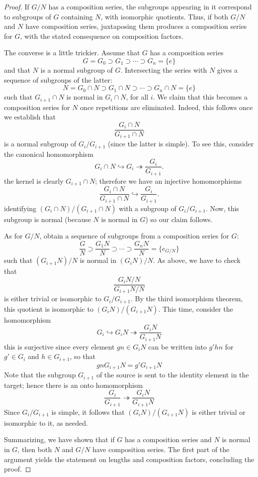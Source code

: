\begin{proof}
If $G/N$ has a composition series, the subgroups appearing in it correspond to subgroups of $G$ containing $N$, with isomorphic quotients. Thus, if both $G/N$ and $N$ have composition series, juxtaposing them produces a composition series for $G$, with the stated consequence on composition factors.\par
The converse is a little trickier. Assume that $G$ has a composition series
\[G=G_0\supset G_1\supset\cdots\supset G_n=\{e\}\]
and that $N$ is a normal subgroup of $G$. Intersecting the series with $N$ gives a sequence of subgroups of the latter:
\[N=G_0\cap N\supset G_1\cap N\supset\cdots\supset G_n\cap N=\{e\}\]
such that $G_{i+1}\cap N$ is normal in $G_i\cap N$, for all $i$. We claim that this becomes a composition series for $N$ once repetitions are eliminated. Indeed, this follows once we establish that
\[\frac{G_{i}\cap N}{G_{i+1}\cap N}\]
is a normal subgroup of $G_{i}/G_{i+1}$ (since the latter is simple). To see this, consider the canonical homomorphism
\[G_i\cap N\hookrightarrow G_i\twoheadrightarrow\frac{G_i}{G_{i+1}}.\]
the kernel is clearly $G_{i+1}\cap N$; therefore we have an injective homomorphisms
\[\frac{G_{i}\cap N}{G_{i+1}\cap N}\hookrightarrow\frac{G_{i}}{G_{i+1}}.\]
identifying $(G_i\cap N)/(G_{i+1}\cap N)$ with a subgroup of $G_i/G_{i+1}$. Now, this subgroup is normal (because $N$ is normal in $G$) so our claim follows.\par
As for $G/N$, obtain a sequence of subgroups from a composition series for $G$:
\[\frac{G}{N}\supset\frac{G_1N}{N}\supset\cdots\supset\frac{G_nN}{N}=\{e_{G/N}\}\]
such that $(G_{i+1}N)/N$ is normal in $(G_iN)/N$. As above, we have to check that 
\[\frac{G_iN/N}{G_{i+1}N/N}\]
is either trivial or isomorphic to $G_i/G_{i+1}$. By the third isomorphism theorem, this quotient is isomorphic to $(G_iN)/(G_{i+1}N)$. This time, consider the homomorphism
\[G_i\hookrightarrow G_iN\twoheadrightarrow\frac{G_iN}{G_{i+1}N}\]
this is surjective since every element $gn\in G_iN$ can be written into $g'hn$ for $g'\in G_i$ and $h\in G_{i+1}$, so that
\[gnG_{i+1}N=g'G_{i+1}N\]
Note that the subgroup $G_{i+1}$ of the source is sent to the identity element in the target; hence there is an onto homomorphism
\[\frac{G_i}{G_{i+1}}\twoheadrightarrow\frac{G_iN}{G_{i+1}N}\]
Since $G_i/G_{i+1}$ is simple, it follows that $(G_iN)/(G_{i+1}N)$ is either trivial or isomorphic to it, as needed.\par 
Summarizing, we have shown that if $G$ has a composition series and $N$ is normal in $G$, then both $N$ and $G/N$ have composition series. The first part of the argument yields the statement on lengths and composition factors, concluding the proof.
\end{proof}
